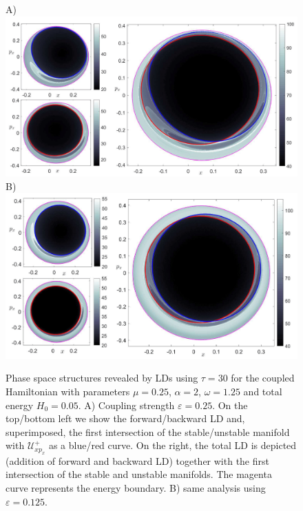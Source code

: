 \documentclass[8pt]{article}
\begin{document}
\begin{figure}[htbp]
	\begin{center}		
		A)\includegraphics[scale=0.102]{fig13a.png}
		B)\includegraphics[scale=0.11]{fig13b.png}
	\end{center}
	\caption{Phase space structures revealed by LDs using $\tau = 30$ for the coupled Hamiltonian with parameters $\mu = 0.25$, $\alpha = 2$, $\omega = 1.25$ and total energy $H_0 = 0.05$. A) Coupling strength $\varepsilon = 0.25$. On the top/bottom left we show the forward/backward LD and, superimposed, the first intersection of the stable/unstable manifold with $\mathcal{U}^{+}_{xp_x}$ as a blue/red curve. On the right, the total LD is depicted (addition of forward and backward LD) together with the first intersection of the stable and unstable manifolds. The magenta curve represents the energy boundary. B) same analysis using $\varepsilon = 0.125$.}
	\label{fig:LD_Manifolds}
\end{figure}


\end{document}
